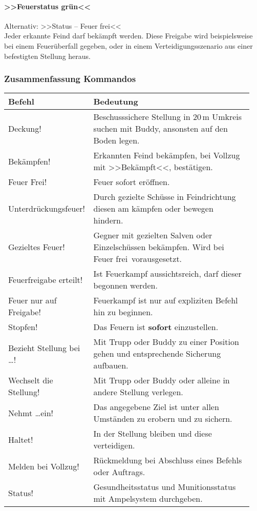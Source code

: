 \paragraph*{>>Feuerstatus grün<<}
	Alternativ: >>Status -- Feuer frei<<\hfil\\
	Jeder erkannte Feind darf bekämpft werden. Diese Freigabe wird beispielsweise bei einem Feuerüberfall gegeben, oder in einem Verteidigungsszenario aus einer befestigten Stellung heraus.
	
\subsubsection{Zusammenfassung Kommandos}
	\begin{longtable}{p{0.3\linewidth}p{0.65\linewidth}} 
		\toprule
		\textbf{Befehl} & \textbf{Bedeutung}\\
		\midrule
		Deckung! & Beschusssichere Stellung in 20\,m Umkreis suchen mit Buddy, ansonsten auf den Boden legen.\\
		Bekämpfen! & Erkannten Feind bekämpfen, bei Vollzug mit >>Bekämpft<<, bestätigen.\\
		Feuer Frei! & Feuer sofort eröffnen.\\
		Unterdrückungsfeuer! & Durch gezielte Schüsse in Feindrichtung diesen am kämpfen oder bewegen hindern.\\
		Gezieltes Feuer! & Gegner mit gezielten Salven oder Einzelschüssen bekämpfen. Wird bei \glqq Feuer frei\grqq\, vorausgesetzt.\\
		Feuerfreigabe erteilt! & Ist Feuerkampf aussichtsreich, darf dieser begonnen werden.\\
		Feuer nur auf Freigabe! & Feuerkampf ist nur auf expliziten Befehl hin zu beginnen.\\
		Stopfen! & Das Feuern ist \textbf{sofort} einzustellen.\\
		Bezieht Stellung bei \dots! & Mit Trupp oder Buddy zu einer Position gehen und entsprechende Sicherung aufbauen.\\
		Wechselt die Stellung! & Mit Trupp oder Buddy oder alleine in andere Stellung verlegen.\\
		Nehmt \dots ein! & Das angegebene Ziel ist unter allen Umständen zu erobern und zu sichern.\\
		Haltet! & In der Stellung bleiben und diese verteidigen.\\
		Melden bei Vollzug! & Rückmeldung bei Abschluss eines Befehls oder Auftrags.\\
		Status! & Gesundheitsstatus und Munitionsstatus mit Ampelsystem durchgeben.\\
		\bottomrule
	\end{longtable}
